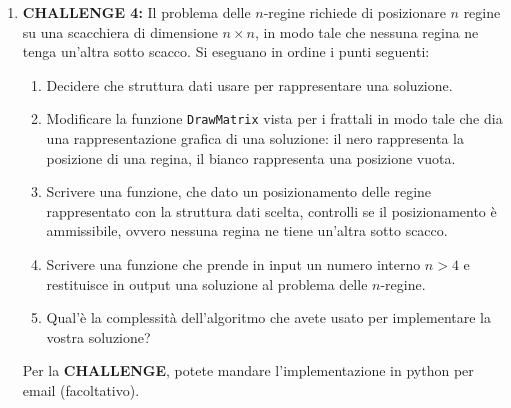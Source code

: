 \documentclass[11pt,a4]{article}
\begin{document}
\begin{enumerate}
\item {\bf CHALLENGE 4:} Il problema delle $n$-regine richiede di posizionare $n$ regine su una scacchiera
di dimensione $n \times n$, in modo tale che nessuna regina ne tenga un'altra sotto scacco. Si eseguano in ordine 
i punti seguenti:
\begin{enumerate}
\item Decidere che struttura dati usare per rappresentare una soluzione.
\item Modificare la funzione {\tt DrawMatrix} vista per i frattali in modo tale che dia una rappresentazione grafica di una soluzione: il nero rappresenta la posizione di una regina, il bianco rappresenta una posizione vuota.
\item Scrivere una funzione, che dato un posizionamento delle regine rappresentato con la struttura dati scelta,
controlli se il posizionamento è ammissibile, ovvero nessuna regina ne tiene un'altra sotto scacco.
\item Scrivere una funzione che prende in input un numero interno $n>4$ e restituisce in output una soluzione al problema
delle $n$-regine.
\item Qual'è la complessità dell'algoritmo che avete usato per implementare la vostra soluzione?
\end{enumerate}

Per la {\bf CHALLENGE}, potete mandare l'implementazione in python per email (facoltativo).
\end{enumerate}
\end{document}
